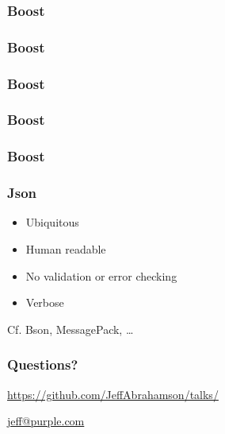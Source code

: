 \documentclass[t]{beamer}
\begin{document}
\begin{frame}
  \frametitle{Boost}

  
\end{frame}

\begin{frame}
  \frametitle{Boost}

  
\end{frame}

\begin{frame}
  \frametitle{Boost}

  
\end{frame}

\begin{frame}
  \frametitle{Boost}

  
\end{frame}

\begin{frame}
  \frametitle{Boost}

  
\end{frame}

\begin{frame}
  \frametitle{Json}

  \begin{itemize}
  \item Ubiquitous
  \item Human readable
  \item No validation or error checking
  \item Verbose
  \end{itemize}

  Cf. Bson, MessagePack, \dots
\end{frame}

\begin{frame}
  \frametitle{Questions?}

  \vfill
  \centerline{\url{https://github.com/JeffAbrahamson/talks/}}
  \vspace{1cm}
  \centerline{\url{jeff@purple.com}}
\end{frame}
\end{document}
